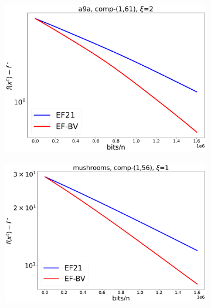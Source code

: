 \documentclass{article} %
\theoremstyle{plain}
\theoremstyle{definition}
\theoremstyle{remark}
\begin{document}
\begin{figure}[!htbp]
      \begin{subfigure}[b]{0.32\textwidth}
         \centering
         \includegraphics[width=\textwidth]{img/a9a/CompK_61_1_a9a_8124workers_3000K_32561_a9a_61_1_1_2_logreg_diff_conv.pdf}
         \label{003}
      \end{subfigure}
      \hfill
      \begin{subfigure}[b]{0.32\textwidth}
         \centering
         \includegraphics[width=\textwidth]{img/mushrooms/CompK_56_1_mushrooms_8124workers_3000K_8124_mushrooms_56_1_1_1_logreg_diff_conv.pdf}
         \label{004}
      \end{subfigure}
      \hfill
      \begin{subfigure}[b]{0.32\textwidth}

\end{subfigure}
\end{figure}
\end{document}
